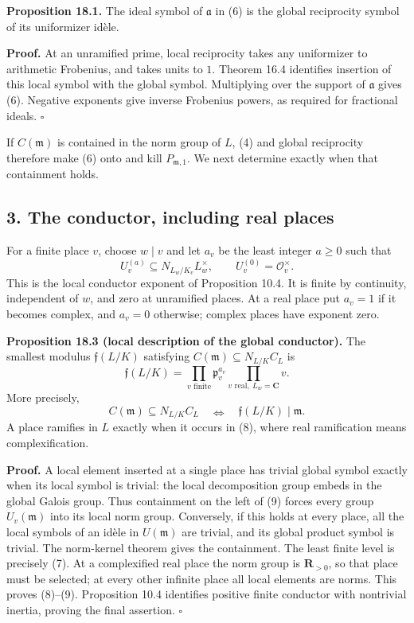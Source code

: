 \documentclass[11pt,a4paper]{article}
\begin{document}
\textbf{Proposition 18.1.} The ideal symbol of \(\mathfrak a\) in (6) is
the global reciprocity symbol of its uniformizer idèle.

\textbf{Proof.} At an unramified prime, local reciprocity takes any
uniformizer to arithmetic Frobenius, and takes units to \(1\). Theorem
16.4 identifies insertion of this local symbol with the global symbol.
Multiplying over the support of \(\mathfrak a\) gives (6). Negative
exponents give inverse Frobenius powers, as required for fractional
ideals. \(\square\)

If \(C(\mathfrak m)\) is contained in the norm group of \(L\), (4) and
global reciprocity therefore make (6) onto and kill
\(P_{\mathfrak m,1}\). We next determine exactly when that containment
holds.

\subsection{3. The conductor, including real
places}\label{the-conductor-including-real-places}

For a finite place \(v\), choose \(w\mid v\) and let \(a_v\) be the
least integer \(a\geq0\) such that \[
U_v^{(a)}\subseteq N_{L_w/K_v}L_w^\times,
\qquad U_v^{(0)}=\mathcal O_v^\times.
\tag{7}
\] This is the local conductor exponent of Proposition 10.4. It is
finite by continuity, independent of \(w\), and zero at unramified
places. At a real place put \(a_v=1\) if it becomes complex, and
\(a_v=0\) otherwise; complex places have exponent zero.

\textbf{Proposition 18.3 (local description of the global conductor).}
The smallest modulus \(\mathfrak f(L/K)\) satisfying
\(C(\mathfrak m)\subseteq N_{L/K}C_L\) is \[
\mathfrak f(L/K)=
\prod_{v\text{ finite}}\mathfrak p_v^{a_v}
\prod_{v\text{ real},\ L_w=\mathbf C}v.
\tag{8}
\] More precisely, \[
C(\mathfrak m)\subseteq N_{L/K}C_L
\quad\Longleftrightarrow\quad\mathfrak f(L/K)\mid\mathfrak m.
\tag{9}
\] A place ramifies in \(L\) exactly when it occurs in (8), where real
ramification means complexification.

\textbf{Proof.} A local element inserted at a single place has trivial
global symbol exactly when its local symbol is trivial: the local
decomposition group embeds in the global Galois group. Thus containment
on the left of (9) forces every group \(U_v(\mathfrak m)\) into its
local norm group. Conversely, if this holds at every place, all the
local symbols of an idèle in \(U(\mathfrak m)\) are trivial, and its
global product symbol is trivial. The norm-kernel theorem gives the
containment. The least finite level is precisely (7). At a complexified
real place the norm group is \(\mathbf R_{>0}\), so that place must be
selected; at every other infinite place all local elements are norms.
This proves (8)--(9). Proposition 10.4 identifies positive finite
conductor with nontrivial inertia, proving the final assertion.
\(\square\)
\end{document}
